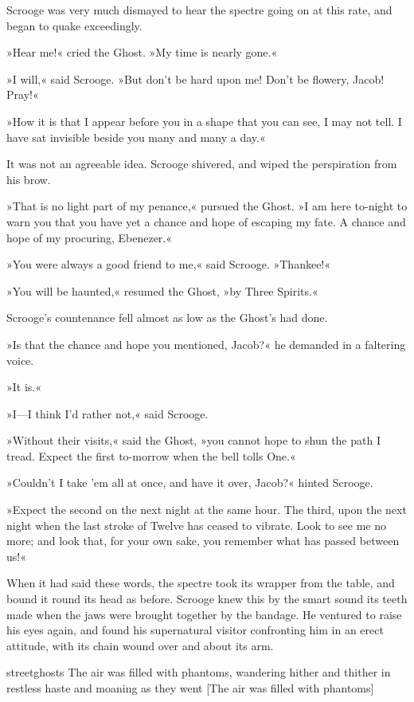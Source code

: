 Scrooge was very much dismayed to hear the spectre going on at this rate, and began to quake exceedingly.

»Hear me!« cried the Ghost. »My time is nearly gone.«

»I will,« said Scrooge. »But don't be hard upon me! Don't be flowery, Jacob! Pray!«

»How it is that I appear before you in a shape that you can see, I may not tell. I have sat invisible beside you many and many a day.«

It was not an agreeable idea. Scrooge shivered, and wiped the perspiration from his brow.

»That is no light part of my penance,« pursued the Ghost. »I am here to-night to warn you that you have yet a chance and hope of escaping my fate. A chance and hope of my procuring, Ebenezer.«

»You were always a good friend to me,« said Scrooge. »Thankee!«

»You will be haunted,« resumed the Ghost, »by Three Spirits.«

Scrooge's countenance fell almost as low as the Ghost's had done.

»Is that the chance and hope you mentioned, Jacob?« he demanded in a faltering voice.

»It is.«

»I---I think I'd rather not,« said Scrooge.

»Without their visits,« said the Ghost, »you cannot hope to shun the path I tread. Expect the first to-morrow when the bell tolls One.«

»Couldn't I take 'em all at once, and have it over, Jacob?« hinted Scrooge.

»Expect the second on the next night at the same hour. The third, upon the next night when the last stroke of Twelve has ceased to vibrate. Look to see me no more; and look that, for your own sake, you remember what has passed between us!«

When it had said these words, the spectre took its wrapper from the table, and bound it round its head as before. Scrooge knew this by the smart sound its teeth made when the jaws were brought together by the bandage. He ventured to raise his eyes again, and found his supernatural visitor confronting him in an erect attitude, with its chain wound over and about its arm.

\begin{colorbigpic}
	[\bigpicsize]
	{streetghosts}
	{The air was filled with phantoms, wandering hither and thither in restless haste and moaning as they went}
	[The air was filled with phantoms]
\end{colorbigpic}


